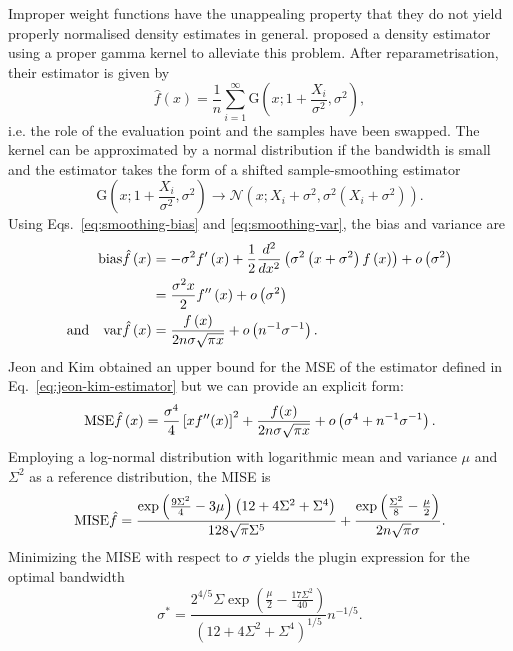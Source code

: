 Improper weight functions have the unappealing property that they do not yield properly normalised density estimates in general. \citet{Jeon2014} proposed a density estimator using a proper gamma kernel to alleviate this problem. After reparametrisation, their estimator is given by
\begin{equation}
\hat{f}\left(x\right)=\frac{1}{n}\sum_{i=1}^{\infty}\mathrm{G}\left(x;1+\frac{X_{i}}{\sigma^{2}},\sigma^{2}\right),\label{eq:jeon-kim-estimator}
\end{equation}
i.e. the role of the evaluation point and the samples have been swapped. The kernel can be approximated by a normal distribution if the bandwidth is small and the estimator takes the form of a shifted sample-smoothing estimator
\[
\mathrm{G}\left(x;1+\frac{X_{i}}{\sigma^{2}},\sigma^{2}\right)\rightarrow\mathcal{N}\left(x;X_{i}+\sigma^{2},\sigma^{2}\left(X_{i}+\sigma^{2}\right)\right).
\]
Using Eqs.~\eqref{eq:smoothing-bias} and \eqref{eq:smoothing-var}, the bias and variance are
\begin{align*}
\bias\hat{f}\left(x\right) & =-\sigma^{2}f'\left(x\right)+\frac{1}{2}\frac{d^{2}}{dx^{2}}\left(\sigma^{2}\left(x+\sigma^{2}\right)f\left(x\right)\right)+o\left(\sigma^{2}\right)\\
 & =\frac{\sigma^{2}x}{2}f''\left(x\right)+o\left(\sigma^{2}\right)\\
\text{and}\quad\var\hat{f}\left(x\right) & =\frac{f\left(x\right)}{2n\sigma\sqrt{\pi x}}+o\left(n^{-1}\sigma^{-1}\right).
\end{align*}
Jeon and Kim obtained an upper bound for the MSE of the estimator defined in Eq.~\eqref{eq:jeon-kim-estimator} but we can provide an explicit form: 
\[
\mathrm{MSE}\hat{f}\left(x\right)=\frac{\sigma^{4}}{4}\left[xf''(x)\right]^{2}+\frac{f(x)}{2n\sigma\sqrt{\pi x}}+o\left(\sigma^{4}+n^{-1}\sigma^{-1}\right).
\]
Employing a log-normal distribution with logarithmic mean and variance $\mu$ and $\Sigma^{2}$ as a reference distribution, the MISE is
\begin{equation}
\mise\hat{f}=\frac{\exp\left(\frac{9\Sigma^{2}}{4}-3\mu\right)\left(12+4\Sigma^{2}+\Sigma^{4}\right)}{128\sqrt{\pi}\Sigma^{5}}+\frac{\exp\left(\frac{\Sigma^{2}}{8}-\frac{\mu}{2}\right)}{2n\sqrt{\pi}\sigma}.\label{eq:jeon-kim-lognormal-mise}
\end{equation}
Minimizing the MISE with respect to $\sigma$ yields the plugin expression for the optimal bandwidth 
\[
\sigma^{*}=\frac{2^{4/5}\Sigma\exp\left(\frac{\mu}{2}-\frac{17\Sigma^{2}}{40}\right)}{\left(12+4\Sigma^{2}+\Sigma^{4}\right)^{1/5}}n^{-1/5}.
\]


